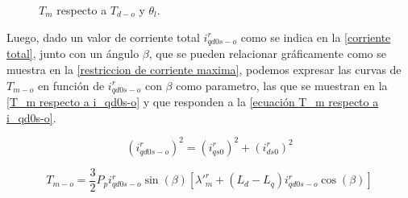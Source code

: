 \documentclass[a4paper, 10pt, onecolumn,journal]{ieeeconf}
\begin{document}
\begin{figure}[H]
    \centering
    \begin{adjustbox}{scale = 0.6}
    \end{adjustbox}
    \caption{$T_m$ respecto a $T_{d-o}$ y $\theta_l$.}
    \label{T_m en función de la posición y T_do}
\end{figure}

Luego, dado un valor de corriente total $i^{r}_{qd0s-o}$ como se indica en la \cref{corriente total}, junto con un
ángulo $\beta$, que se pueden relacionar
gráficamente como se muestra en la \cref{restriccion de corriente maxima}, podemos expresar
las curvas de $T_{m-o}$ en función de $i^{r}_{qd0s-o}$ con $\beta$ como parametro, las que
se muestran en la \cref{T_m respecto a i_qd0s-o} y que responden a la \cref{ecuación T_m respecto a i_qd0s-o}.


\begin{equation}
    \left(i^{r}_{qd0s-o}\right)^2 = \left(i^{r}_{qs0}\right)^2 + \left(i^{r}_{ds0}\right)^2
    \label{corriente total}
\end{equation}

\begin{equation}
    T_{m-o} = \frac{3}{2} P_p i^r_{qd0s-o}\sin(\beta)\left[\lambda'^r_m + (L_d - L_q) i^r_{qd0s-o}\cos(\beta)\right]
    \label{ecuación T_m respecto a i_qd0s-o}
\end{equation}
\end{document}

